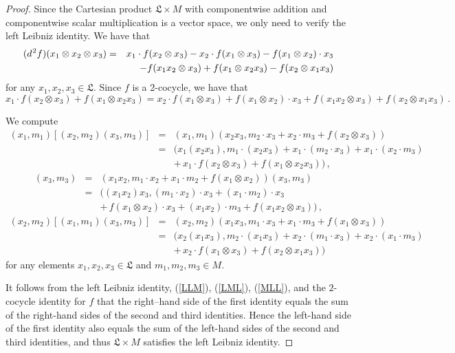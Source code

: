 \documentclass{amsart}
\numberwithin{equation}{section}
\newcommand{\lf}{\mathfrak{L}}
\begin{document}
\begin{proof}
Since the Cartesian product $\lf\times M$ with componentwise addition and componentwise scalar
multiplication is a vector space, we only need to verify the left Leibniz identity. We have that
\begin{eqnarray*}
(d\hspace{.2mm}^2 f)(x_1\otimes x_2\otimes x_3) & = & x_1\cdot f(x_2\otimes x_3)-x_2\cdot
f(x_1\otimes x_3)-f(x_1\otimes x_2)\cdot x_3\\
& & -f(x_1x_2\otimes x_3)+f(x_1\otimes x_2x_3)-f(x_2\otimes x_1x_3)
\end{eqnarray*}
for any $x_1,x_2,x_3\in\lf$.
Since $f$ is a $2$-cocycle, we have that $$x_1\cdot f(x_2\otimes x_3)+f(x_1\otimes x_2x_3)=
x_2\cdot f(x_1\otimes x_3)+f(x_1\otimes x_2)\cdot x_3+f(x_1x_2\otimes x_3)+f(x_2\otimes x_1x_3)\,.$$

We compute
\begin{eqnarray*}
(x_1,m_1)[(x_2,m_2)(x_3,m_3)] & = & (x_1,m_1)(x_2x_3,m_2\cdot x_3+x_2\cdot m_3+f(x_2\otimes x_3))\\
& = & (x_1(x_2x_3),m_1\cdot(x_2x_3)+x_1\cdot(m_2\cdot x_3)+x_1\cdot(x_2\cdot m_3)\\
& & +\,x_1\cdot f(x_2\otimes x_3)+f(x_1\otimes x_2x_3))\,,
\end{eqnarray*}
\begin{eqnarray*}
[(x_1,m_1)(x_2,m_2)](x_3,m_3) & = & (x_1x_2,m_1\cdot x_2+x_1\cdot m_2+f(x_1\otimes x_2))(x_3,m_3)\\
& = & ((x_1x_2)x_3,(m_1\cdot x_2)\cdot x_3+(x_1\cdot m_2)\cdot x_3\\
& & +\,f(x_1\otimes x_2)\cdot x_3+(x_1x_2)\cdot m_3+f(x_1x_2\otimes x_3))\,,
\end{eqnarray*}
\begin{eqnarray*}
(x_2,m_2)[(x_1,m_1)(x_3,m_3)] & = & (x_2,m_2)(x_1x_3,m_1\cdot x_3+x_1\cdot m_3+f(x_1\otimes x_3))\\
& = & (x_2(x_1x_3),m_2\cdot(x_1x_3)+x_2\cdot(m_1\cdot x_3)+x_2\cdot(x_1\cdot m_3)\\
& & +\,x_2\cdot f(x_1\otimes x_3)+f(x_2\otimes x_1x_3))
\end{eqnarray*}
for any elements $x_1,x_2,x_3\in\lf$ and $m_1,m_2,m_3\in M$.

It follows from the left Leibniz identity, (\ref{LLM}), (\ref{LML}), (\ref{MLL}), and the $2$-cocycle
identity for $f$ that the right--hand side of the first identity equals the sum of the right-hand sides
of the second and third identities. Hence the left-hand side of the first identity also equals the
sum of the left-hand sides of the second and third identities, and thus $\lf\times M$ satisfies the
left Leibniz identity.
\end{proof}
\end{document}
